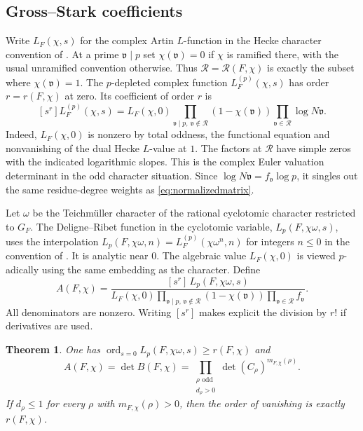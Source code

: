 \documentclass[11pt]{amsart}
\numberwithin{equation}{section}
\newtheorem{theorem}{Theorem}[section]
\theoremstyle{definition}
\theoremstyle{remark}
\newcommand{\ord}{\operatorname{ord}}
\begin{document}
\subsection{Gross--Stark coefficients}

Write $L_F(\chi,s)$ for the complex Artin $L$-function in
the Hecke character convention of \cite{DKV}. At a prime
$\mathfrak v\mid p$ set $\chi(\mathfrak v)=0$ if $\chi$
is ramified there, with the usual unramified convention
otherwise. Thus $\mathcal R=\mathcal R(F,\chi)$ is
exactly the subset where $\chi(\mathfrak v)=1$.
The $p$-depleted complex function
$L_F^{(p)}(\chi,s)$ has order $r=r(F,\chi)$ at zero.
Its coefficient of order $r$ is
\begin{equation}\label{eq:complexgross}
 [s^r]L_F^{(p)}(\chi,s)
 = L_F(\chi,0)\prod_{\mathfrak v\mid p,\ \mathfrak v\notin\mathcal R}
       (1-\chi(\mathfrak v))
   \prod_{\mathfrak v\in\mathcal R}\log N\mathfrak v .
\end{equation}
Indeed, $L_F(\chi,0)$ is nonzero by total oddness, the
functional equation and nonvanishing of the dual Hecke
$L$-value at $1$. The factors at $\mathcal R$ have simple
zeros with the indicated logarithmic slopes. This is the
complex Euler valuation determinant in the odd character
situation. Since $\log N\mathfrak v=f_\mathfrak v\log p$,
it singles out the same residue-degree weights as
\eqref{eq:normalizedmatrix}.

Let $\omega$ be the Teichm\"uller character of the rational
cyclotomic character restricted to $G_F$. The
Deligne--Ribet function in the cyclotomic variable,
$L_p(F,\chi\omega,s)$, uses the interpolation
$L_p(F,\chi\omega,n)=L_F^{(p)}(\chi\omega^n,n)$ for
integers $n\le0$ in the convention of \cite[eq.~(3)]{DKV}.
It is analytic near $0$. The algebraic value $L_F(\chi,0)$
is viewed $p$-adically using the same embedding as the
character. Define
\begin{equation}\label{eq:normcoeff}
 A(F,\chi)=
 \frac{[s^r]\,L_p(F,\chi\omega,s)}
 {L_F(\chi,0)
  \displaystyle\prod_{\mathfrak v\mid p,\,
                       \mathfrak v\notin\mathcal R}
  (1-\chi(\mathfrak v))
  \displaystyle\prod_{\mathfrak v\in\mathcal R}f_\mathfrak v}.
\end{equation}
All denominators are nonzero. Writing $[s^r]$ makes
explicit the division by $r!$ if derivatives are used.

\begin{theorem}\label{thm:analytic}
One has $\ord_{s=0}L_p(F,\chi\omega,s)\ge r(F,\chi)$ and
\begin{equation}\label{eq:factorcoeff}
 A(F,\chi)=\det B(F,\chi)
  =\prod_{\substack{\rho\text{ odd}\\d_\rho>0}}
     \det(C_\rho)^{m_{F,\chi}(\rho)} .
\end{equation}
If $d_\rho\le 1$ for every $\rho$ with $m_{F,\chi}(\rho)>0$,
then the order of vanishing is exactly $r(F,\chi)$.
\end{theorem}
\end{document}

